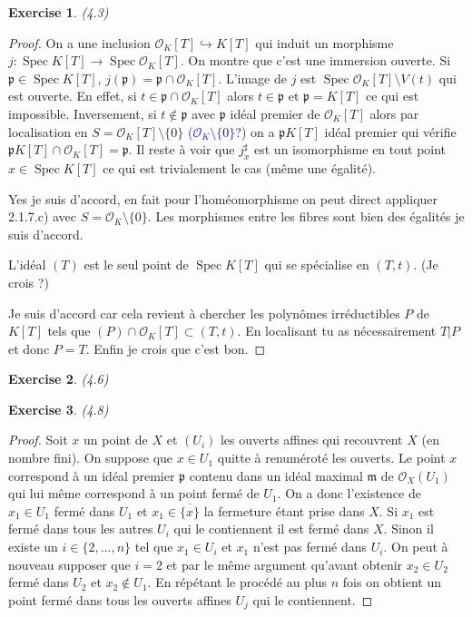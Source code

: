 \documentclass[A4, 11pt]{article}
\newtheorem{exer}{Exercise}
\def\Spec{ \operatorname{Spec}}
\begin{document}
\begin{exer}(4.3)
\end{exer}
\begin{proof}
On a une inclusion $\mathcal{O}_K[T] \hookrightarrow K[T]$ qui induit un morphisme 
$j\colon \Spec K[T] \rightarrow \Spec \mathcal{O}_K [T]$. On montre que c'est une immersion ouverte. Si $\mathfrak{p}\in \Spec K[T]$, $j(\mathfrak{p})=\mathfrak{p}\cap \mathcal{O}_K[T]$. L'image de $j$ est $\Spec \mathcal{O}_K[T] \setminus V(t)$ qui est ouverte. En effet, si $t\in \mathfrak{p}\cap \mathcal{O}_K[T]$ alors $t\in \mathfrak{p}$ et $\mathfrak{p}=K[T]$ ce qui est impossible. Inversement, si $t\notin \mathfrak{p}$ avec $\mathfrak{p}$ idéal premier de $\mathcal{O}_K[T]$ alors par localisation en $S=\mathcal{O}_K[T]\setminus \{0\}$ \textcolor{blue}{($\mathcal{O}_K\setminus \{0\}$?)} on a $\mathfrak{p}K[T]$ idéal premier qui vérifie $\mathfrak{p}K[T]\cap \mathcal{O}_K[T]=\mathfrak{p}$. Il reste à voir que $j^{\sharp}_x$ est un isomorphisme en tout point $x\in \Spec K[T]$ ce qui est trivialement le cas (même une égalité).

{\color{blue} Yes je suis d'accord, en fait pour l'homéomorphisme on peut direct appliquer 2.1.7.c) avec $S=\mathcal{O}_K\setminus \{0\}$. Les morphismes entre les fibres sont bien des égalités je suis d'accord.}

 L'idéal $(T)$ est le seul point de $\Spec K[T]$ qui se spécialise en $(T,t)$. (Je crois ?)
 
{\color{blue} Je suis d'accord car cela revient à chercher les polynômes irréductibles $P$ de $K[T]$ tels que $(P)\cap \mathcal{O}_K[T]\subset (T, t)$. En localisant tu as nécessairement $T| P$ et donc $P=T$. Enfin je crois que c'est bon.}
\end{proof}
\begin{exer}(4.6)
\end{exer}
\begin{exer}(4.8)
\end{exer}
\begin{proof}
Soit $x$ un point de $X$ et $(U_i)$ les ouverts affines qui recouvrent $X$ (en nombre fini). On suppose que $x\in U_1$ quitte à renuméroté les ouverts. Le point $x$ correspond à un idéal premier $\mathfrak{p}$ contenu dans un idéal maximal $\mathfrak{m}$ de $\mathcal{O}_X(U_1)$ qui lui même correspond à un point fermé de $U_1$. On a donc l'existence de $x_1\in U_1$ fermé dans $U_1$ et $x_1\in \overline{\{x\}}$ la fermeture étant prise dans $X$. Si $x_1$ est fermé dans tous les autres $U_i$ qui le contiennent il est fermé dans $X$. Sinon il existe un $i\in \{2,\dots , n\}$ tel que $x_1\in U_i$ et $x_1$ n'est pas fermé dans $U_i$. On peut à nouveau supposer que $i=2$ et par le même argument qu'avant obtenir $x_2\in U_2$ fermé dans $U_2$ et $x_2\notin U_1$. En répétant le procédé au plus $n$ fois on obtient un point fermé dans tous les ouverts affines $U_j$ qui le contiennent.
\end{proof}
\end{document}
